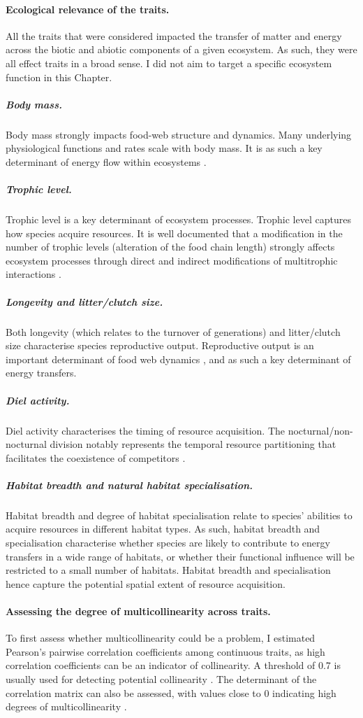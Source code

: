 \paragraph{Ecological relevance of the traits.} All the traits that were considered impacted the transfer of matter and energy across the biotic and abiotic components of a given ecosystem. As such, they were all effect traits in a broad sense. I did not aim to target a specific ecosystem function in this Chapter.

\subparagraph{Body mass.} Body mass strongly impacts food-web structure and dynamics. Many underlying physiological functions and rates scale with body mass. It is as such a key determinant of energy flow within ecosystems \citep{Thompson2012,Malhi2016, Harfoot2014, Gillooly2001}.

\subparagraph{Trophic level.} Trophic level is a key determinant of ecosystem processes. Trophic level captures how species acquire resources. It is well documented that a modification in the number of trophic levels (alteration of the food chain length) strongly affects ecosystem processes through direct and indirect modifications of multitrophic interactions \citep{Duffy2007, Duffy2003, Thebault2003}. 
 
\subparagraph{Longevity and litter/clutch size.} Both longevity (which relates to the turnover of generations) and litter/clutch size characterise species reproductive output. Reproductive output is an important determinant of food web dynamics \citep{Chase1999, Hartvig2011}, and as such a key determinant of energy transfers.

\subparagraph{Diel activity.} Diel activity characterises the timing of resource acquisition. The nocturnal/non-nocturnal division notably represents the temporal resource partitioning that facilitates the coexistence of competitors \citep{Fox2011}. 

\subparagraph{Habitat breadth and natural habitat specialisation.} Habitat breadth and degree of habitat specialisation relate to species' abilities to acquire resources in different habitat types. As such, habitat breadth and specialisation characterise whether species are likely to contribute to energy transfers in a wide range of habitats, or whether their functional influence will be restricted to a small number of habitats. Habitat breadth and specialisation hence capture the potential spatial extent of resource acquisition.
 

\paragraph{Assessing the degree of multicollinearity across traits.}
To first assess whether multicollinearity could be a problem, I estimated Pearson's pairwise correlation coefficients among continuous traits, as high correlation coefficients can be an indicator of collinearity. A threshold of 0.7 is usually used for detecting potential collinearity \citep{Dormann2013}. The determinant of the correlation matrix can also be assessed, with values close to 0 indicating high degrees of multicollinearity \citep{Dormann2013}.

